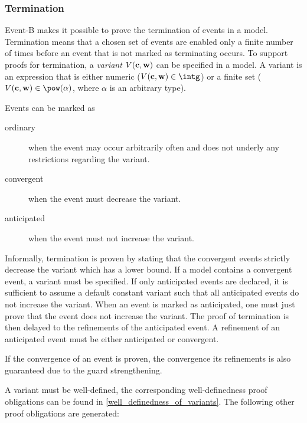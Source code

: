 \subsubsection{Termination}
\label{termination}
Event-B makes it possible to prove the termination of events in a model.
Termination means that a chosen set of events are enabled only a finite number
 of times before an event that is not marked as terminating occurs.
To support proofs for termination, a \emph{variant} $V(\mathbf{c},\mathbf{w})$ can be specified in a model.
A variant is an expression that is either numeric 
 ($V(\allconstants,\concvariables)\in\intg$) or
 a finite set ($V(\allconstants,\concvariables)\in\pow(\alpha)$,
 where $\alpha$ is an arbitrary type).

Events can be marked as
\begin{description}
\item[ordinary] when the event may occur arbitrarily often and does not underly any restrictions
  regarding the variant.
\item[convergent] when the event must decrease the variant.
\item[anticipated] when the event must not increase the variant.
\end{description}
Informally, termination is proven by stating that the convergent events strictly decrease the variant
  which has a lower bound.
If a model contains a convergent event, a variant must be specified.
If only anticipated events are declared, it is sufficient to assume a default constant variant such
  that all anticipated events do not increase the variant.
When an event is marked as anticipated, one must just prove that the event does not increase the
  variant.
The proof of termination is then delayed to the refinements of the anticipated event.
A refinement of an anticipated event must be either anticipated or convergent.

If the convergence of an event is proven, the convergence its refinements is also guaranteed due to
  the guard strengthening.

A variant must be well-defined, the corresponding well-definedness proof obligations
  can be found in \ref{well_definedness_of_variants}.
The following other proof obligations are generated:

